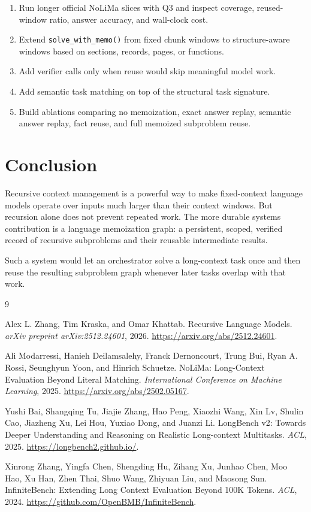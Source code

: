 \documentclass[11pt]{article}
\begin{document}
\begin{enumerate}[leftmargin=*]
    \item Run longer official NoLiMa slices with Q3 and inspect coverage,
    reused-window ratio, answer accuracy, and wall-clock cost.
    \item Extend \texttt{solve\_with\_memo()} from fixed chunk windows to
    structure-aware windows based on sections, records, pages, or functions.
    \item Add verifier calls only when reuse would skip meaningful model work.
    \item Add semantic task matching on top of the structural task signature.
    \item Build ablations comparing no memoization, exact answer replay,
    semantic answer replay, fact reuse, and full memoized subproblem reuse.
\end{enumerate}

\section{Conclusion}

Recursive context management is a powerful way to make fixed-context language
models operate over inputs much larger than their context windows. But
recursion alone does not prevent repeated work. The more durable systems
contribution is a language memoization graph: a persistent, scoped, verified
record of recursive subproblems and their reusable intermediate results.

Such a system would let an orchestrator solve a long-context task once and
then reuse the resulting subproblem graph whenever later tasks overlap with
that work.

\begin{thebibliography}{9}

Alex L. Zhang, Tim Kraska, and Omar Khattab.
\newblock Recursive Language Models.
\newblock \emph{arXiv preprint arXiv:2512.24601}, 2026.
\newblock \url{https://arxiv.org/abs/2512.24601}.

Ali Modarressi, Hanieh Deilamsalehy, Franck Dernoncourt, Trung Bui,
Ryan A. Rossi, Seunghyun Yoon, and Hinrich Schuetze.
\newblock NoLiMa: Long-Context Evaluation Beyond Literal Matching.
\newblock \emph{International Conference on Machine Learning}, 2025.
\newblock \url{https://arxiv.org/abs/2502.05167}.

Yushi Bai, Shangqing Tu, Jiajie Zhang, Hao Peng, Xiaozhi Wang, Xin Lv,
Shulin Cao, Jiazheng Xu, Lei Hou, Yuxiao Dong, and Juanzi Li.
\newblock LongBench v2: Towards Deeper Understanding and Reasoning on
Realistic Long-context Multitasks.
\newblock \emph{ACL}, 2025.
\newblock \url{https://longbench2.github.io/}.

Xinrong Zhang, Yingfa Chen, Shengding Hu, Zihang Xu, Junhao Chen, Moo Hao,
Xu Han, Zhen Thai, Shuo Wang, Zhiyuan Liu, and Maosong Sun.
\newblock InfiniteBench: Extending Long Context Evaluation Beyond 100K Tokens.
\newblock \emph{ACL}, 2024.
\newblock \url{https://github.com/OpenBMB/InfiniteBench}.

\end{thebibliography}
\end{document}
